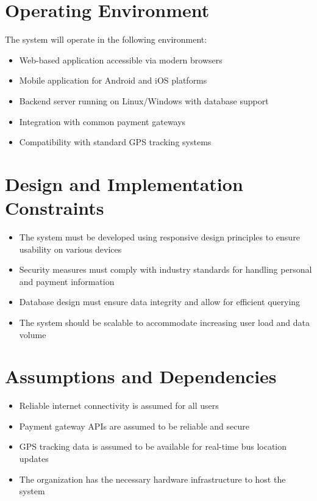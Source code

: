 \documentclass[12pt,a4paper]{report}
\begin{document}
\section{Operating Environment}
The system will operate in the following environment:
\begin{itemize}
    \item Web-based application accessible via modern browsers
    \item Mobile application for Android and iOS platforms
    \item Backend server running on Linux/Windows with database support
    \item Integration with common payment gateways
    \item Compatibility with standard GPS tracking systems
\end{itemize}

\section{Design and Implementation Constraints}
\begin{itemize}
    \item The system must be developed using responsive design principles to ensure usability on various devices
    \item Security measures must comply with industry standards for handling personal and payment information
    \item Database design must ensure data integrity and allow for efficient querying
    \item The system should be scalable to accommodate increasing user load and data volume
\end{itemize}

\section{Assumptions and Dependencies}
\begin{itemize}
    \item Reliable internet connectivity is assumed for all users
    \item Payment gateway APIs are assumed to be reliable and secure
    \item GPS tracking data is assumed to be available for real-time bus location updates
    \item The organization has the necessary hardware infrastructure to host the system
\end{itemize}
\end{document}
